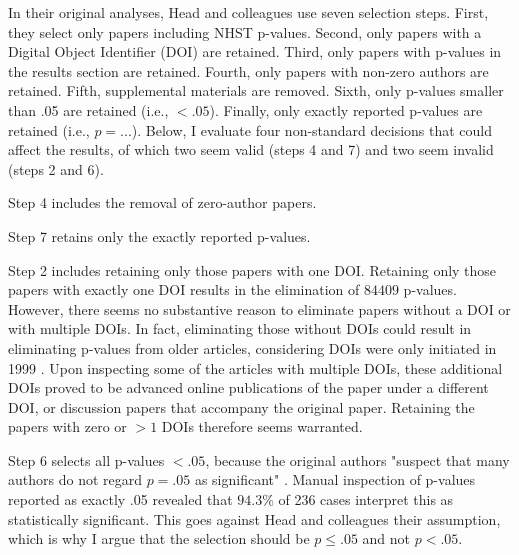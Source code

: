 In their original analyses, Head and colleagues use seven selection steps. First, they select only papers including NHST p-values. Second, only papers with a Digital Object Identifier (DOI) are retained. Third, only papers with p-values in the results section are retained. Fourth, only papers with non-zero authors are retained. Fifth, supplemental materials are removed. Sixth, only p-values smaller than .05 are retained (i.e., $<.05$). Finally, only exactly reported p-values are retained (i.e., $p=...$). Below, I evaluate four non-standard decisions that could affect the results, of which two seem valid (steps 4 and 7) and two seem invalid (steps 2 and 6).

Step 4 includes the removal of zero-author papers.

Step 7 retains only the exactly reported p-values.

Step 2 includes retaining only those papers with one DOI. Retaining only those papers with exactly one DOI results in the elimination of $84409$ p-values. However, there seems no substantive reason to eliminate papers without a DOI or with multiple DOIs. In fact, eliminating those without DOIs could result in eliminating p-values from older articles, considering DOIs were only initiated in 1999 \cite{crossref2009}. Upon inspecting some of the articles with multiple DOIs, these additional DOIs proved to be advanced online publications of the paper under a different DOI, or discussion papers that accompany the original paper. Retaining the papers with zero or $>1$ DOIs therefore seems warranted.

Step 6 selects all p-values $<.05$, because the original authors "suspect that many authors do not regard $p=.05$ as significant" \cite{Head2015}. Manual inspection of p-values reported as exactly .05 revealed that $94.3\%$ of 236 cases interpret this as statistically significant. This goes against Head and colleagues their assumption, which is why I argue that the selection should be $p\leq.05$ and not $p<.05$.
